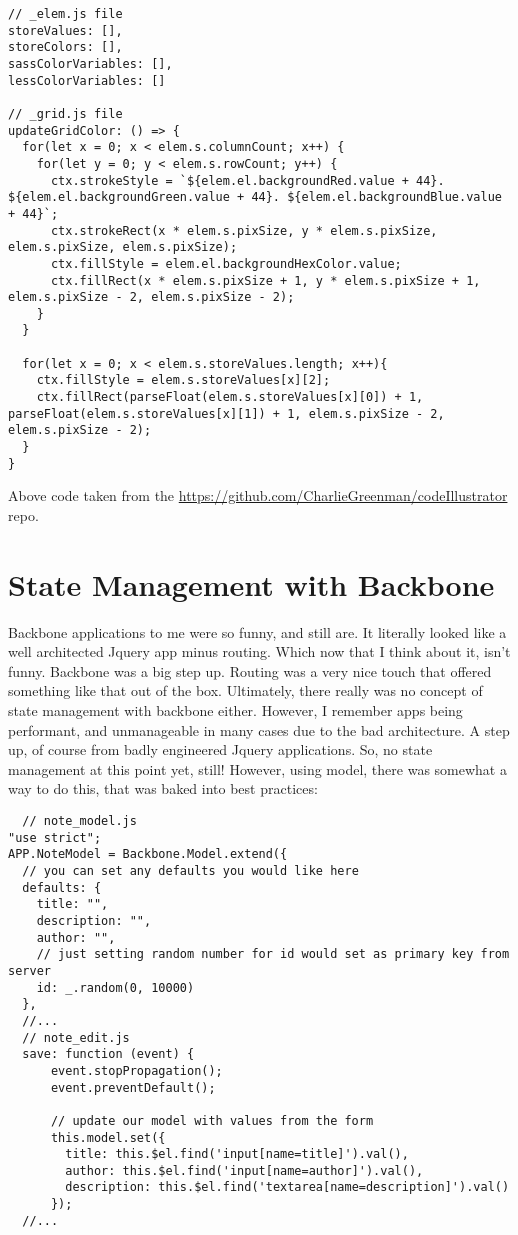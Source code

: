 \begin{lstlisting}
// _elem.js file
storeValues: [],
storeColors: [],
sassColorVariables: [],
lessColorVariables: []

// _grid.js file
updateGridColor: () => {
  for(let x = 0; x < elem.s.columnCount; x++) {
    for(let y = 0; y < elem.s.rowCount; y++) {
      ctx.strokeStyle = `${elem.el.backgroundRed.value + 44}. ${elem.el.backgroundGreen.value + 44}. ${elem.el.backgroundBlue.value + 44}`;
      ctx.strokeRect(x * elem.s.pixSize, y * elem.s.pixSize, elem.s.pixSize, elem.s.pixSize);
      ctx.fillStyle = elem.el.backgroundHexColor.value;
      ctx.fillRect(x * elem.s.pixSize + 1, y * elem.s.pixSize + 1, elem.s.pixSize - 2, elem.s.pixSize - 2);
    }
  }

  for(let x = 0; x < elem.s.storeValues.length; x++){
    ctx.fillStyle = elem.s.storeValues[x][2];
    ctx.fillRect(parseFloat(elem.s.storeValues[x][0]) + 1, parseFloat(elem.s.storeValues[x][1]) + 1, elem.s.pixSize - 2, elem.s.pixSize - 2);
  }
}

\end{lstlisting}
Above code taken from the \href{codeIllustrator}{https://github.com/CharlieGreenman/codeIllustrator} repo.

\section{ State Management with Backbone }
Backbone applications to me were so funny, and still are. It literally looked
like a well architected Jquery app minus routing. Which now that I think about
it, isn't funny. Backbone was a big step up. Routing was a very nice touch that
offered something like that out of the box. Ultimately, there really was no
concept of state management with backbone either. However, I remember apps being
performant, and unmanageable in many cases due to the bad architecture. A step
up, of course from badly engineered Jquery applications. So, no state management
at this point yet, still! However, using model, there was somewhat a way to do
this, that was baked into best practices:

\begin{lstlisting}
  // note_model.js
"use strict";
APP.NoteModel = Backbone.Model.extend({
  // you can set any defaults you would like here
  defaults: {
    title: "",
    description: "",
    author: "",
    // just setting random number for id would set as primary key from server
    id: _.random(0, 10000)
  },
  //...
  // note_edit.js
  save: function (event) {
      event.stopPropagation();
      event.preventDefault();

      // update our model with values from the form
      this.model.set({
        title: this.$el.find('input[name=title]').val(),
        author: this.$el.find('input[name=author]').val(),
        description: this.$el.find('textarea[name=description]').val()
      });
  //...

\end{lstlisting}

